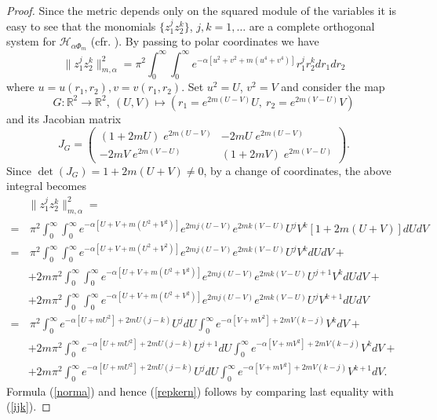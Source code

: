\documentclass[11pt, reqno]{amsart}
\begin{document}
\begin{proof}
Since the metric depends only on the squared module of the variables it is easy to see that the monomials $\{z_1^j z_2^k\}$, $j, k=1, \dots $ are a complete orthogonal system for ${\mathcal{H}}_{\alpha\Phi_m}$  (cfr. \cite[Lemma 3.11]{englquant}).
By passing to polar coordinates we have
$$\| z_1^j z_2^k \|^2_{m, \alpha} = \pi^2 \int_{0}^{\infty} \int_{0}^{\infty} e^{- \alpha [u^2 + v^2 + m( u^4 +
v^4)]} r_1^{j} r_2^{k} dr_1 dr_2$$
where $u = u(r_1, r_2), v = v(r_1, r_2)$. Set  $u^2 = U$, $v^2 = V$ and consider the map
$$G:
{\mathbb{R}}^2 \rightarrow {\mathbb{R}}^2, \ (U, V) \mapsto  (r_1=e^{2m(U-V)} U,\
r_2=e^{2m(V-U)} V)$$ and its Jacobian matrix
\begin{displaymath}
J_G = \left( \begin{array}{cc}
(1 + 2mU) \; e^{2m(U-V)} &  - 2 m U \; e^{2m(U-V)} \\
- 2 m V \; e^{2m(V-U)} &  (1 + 2m V) \; e^{2m(V-U)}
\end{array} \right) .
\end{displaymath}
Since $\det(J_G) = 1 + 2 m (U + V) \neq 0$, by a change of coordinates, the above integral becomes
\begin{equation}
\begin{split}
&\| z_1^j z_2^k \|^2_{m, \alpha} =\\
=&\,\pi^2\!\! \int_{0}^{\infty}\!\!\!\! \int_{0}^{\infty}\!\!\!\!\! e^{- \alpha [U + V + m( U^2 +V^2)]} e^{2m j(U-V)} e^{2m k (V-U)} U^j V^k [1 + 2 m (U\! +\! V)] dUdV\\
=&\,\pi^2\!\! \int_{0}^{\infty} \int_{0}^{\infty} e^{- \alpha [U + V + m( U^2 +
V^2)]} e^{2m j(U-V)} e^{2m k (V-U)} U^j V^k dU dV +\\
&+ 2 m \pi^2 \int_{0}^{\infty} \int_{0}^{\infty} e^{- \alpha [U + V
+ m( U^2 + V^2)]} e^{2m j(U-V)} e^{2m k (V-U)} U^{j+1} V^k dU dV
+\\
&+2 m \pi^2 \int_{0}^{\infty} \int_{0}^{\infty} e^{- \alpha [U + V
+ m( U^2 + V^2)]} e^{2m j(U-V)} e^{2m k (V-U)} U^{j} V^{k+1}dU dV\nonumber
\end{split}
\end{equation}
\begin{equation}
\begin{split}
=&\,\pi^2\!\! \int_{0}^{\infty} e^{- \alpha [U + m U^2]+ 2mU(j -k)} U^j dU \int_{0}^{\infty} e^{-
\alpha [V + m V^2] + 2mV (k-j)} V^k dV +\\
&+ 2m \pi^2\!\! \int_{0}^{\infty} \!\!\!\!e^{- \alpha [U + m U^2]+ 2mU(j -k)} U^{j+1} dU \int_{0}^{\infty} e^{-
\alpha [V + m V^2] + 2mV (k-j)} V^k dV +\\
&+ 2m \pi^2\!\! \int_{0}^{\infty} e^{- \alpha [U + m U^2]+ 2mU(j -k)} U^j dU \int_{0}^{\infty} e^{-
\alpha [V + m V^2] + 2mV (k-j)} V^{k+1} dV.\nonumber
\end{split}
\end{equation}
Formula (\ref{norma}) and hence (\ref{repkern}) follows by  comparing last equality with (\ref{ijk}).
\end{proof}
\end{document}

